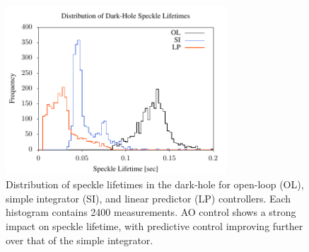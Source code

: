 \documentclass[10pt,preprint]{aastex631}
\begin{document}
\begin{figure}[h]
\centering
\includegraphics[width=3.25in]{slHist.pdf}
\caption{Distribution of speckle lifetimes in the dark-hole for open-loop (OL), simple integrator (SI), and linear predictor (LP) controllers. Each histogram contains 2400 measurements.  AO control shows a strong impact on speckle lifetime, with predictive control improving further over that of the simple integrator. 
\label{fig:slHist}
}
\end{figure}
\end{document}
